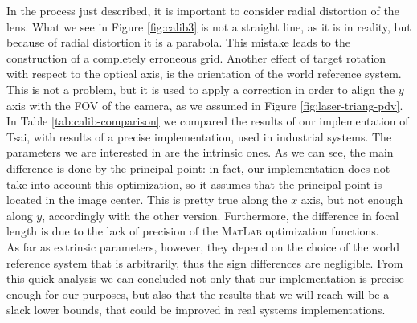 
In the process just described, it is important to consider radial distortion of the lens. What we see in Figure \ref{fig:calib3} is not a straight line, as it is in reality, but because of radial distortion it is a parabola. This mistake leads to the construction of a completely erroneous grid. Another effect of target rotation with respect to the optical axis, is the orientation of the world reference system. This is not a problem, but it is used to apply a correction in order to align the $y$ axis with the \acs{FOV} of the camera, as we assumed in Figure \ref{fig:laser-triang-pdv}. \\


In Table \ref{tab:calib-comparison} we compared the results of our implementation of Tsai, with results of a precise implementation, used in industrial systems. The parameters we are interested in are the intrinsic ones. As we can see, the main difference is done by the principal point: in fact, our implementation does not take into account this optimization, so it assumes that the principal point is located in the image center. This is pretty true along the $x$ axis, but not enough along $y$, accordingly with the other version. Furthermore, the difference in focal length is due to the lack of precision of the \textsc{MatLab} optimization functions. \\
As far as extrinsic parameters, however, they depend on the choice of the world reference system that is arbitrarily, thus the sign differences are negligible. From this quick analysis we can concluded not only that our implementation is precise enough for our purposes, but also that the results that we will reach will be a slack lower bounds, that could be improved in real systems implementations. \\
